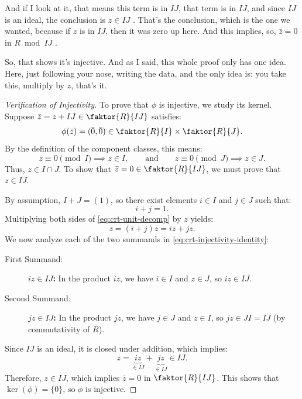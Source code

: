 \begin{proofWrapper}
\begin{speech}[00:07:50 - 00:09:25]
And if I look at it, that means this term is in $IJ$, that term is in $IJ$, and since $IJ$ is an ideal, the conclusion is $z \in IJ$ . That's the conclusion, which is the one we wanted, because if $z$ is in $IJ$, then it was zero up here. And this implies, so, $\bar{z} = 0$ in $R \bmod IJ$ .

So, that shows it's injective. And as I said, this whole proof only has one idea. Here, just following your nose, writing the data, and the only idea is: you take this, multiply by $z$, that's it.
\end{speech}

\begin{content}
\begin{proof}[Verification of Injectivity]
To prove that $\phi$ is injective, we study its kernel. Suppose $\bar{z} = z + IJ \in \faktor{R}{IJ}$ satisfies:
\[
\phi(\bar{z}) = (\bar{0}, \bar{0}) \in \faktor{R}{I} \times \faktor{R}{J}.
\]
By the definition of the component classes, this means:
\[
z \equiv 0 \pmod I \implies z \in I, \qquad \text{and} \qquad z \equiv 0 \pmod J \implies z \in J.
\]
Thus, $z \in I \cap J$. To show that $\bar{z} = 0 \in \faktor{R}{IJ}$, we must prove that $z \in IJ$.

\par\vspace{1ex}\noindent
By assumption, $I + J = (1)$, so there exist elements $i \in I$ and $j \in J$ such that:
\begin{equation}\label{eq:crt-unit-decomp}
i + j = 1.
\end{equation}
Multiplying both sides of \eqref{eq:crt-unit-decomp} by $z$ yields:
\begin{equation}\label{eq:crt-injectivity-identity}
z = (i + j)z = iz + jz.
\end{equation}
We now analyze each of the two summands in \eqref{eq:crt-injectivity-identity}:
\begin{description}
    \item[First Summand:] \textbf{$iz \in IJ$:} In the product $iz$, we have $i \in I$ and $z \in J$, so $iz \in IJ$.
    \item[Second Summand:] \textbf{$jz \in IJ$:} In the product $jz$, we have $j \in J$ and $z \in I$, so $jz \in JI = IJ$ (by commutativity of $R$).
\end{description}
Since $IJ$ is an ideal, it is closed under addition, which implies:
\[
z = \underbrace{iz}_{\in IJ} + \underbrace{jz}_{\in IJ} \in IJ.
\]
Therefore, $z \in IJ$, which implies $\bar{z} = 0$ in $\faktor{R}{IJ}$. This shows that $\ker(\phi) = \{0\}$, so $\phi$ is injective.
\end{proof}
\end{content}


\end{proofWrapper}
